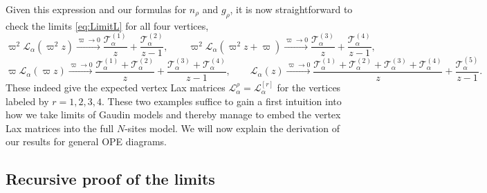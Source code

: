 \documentclass{article}
\def\Lc{\mathcal{L}}
\begin{document}
Given this expression and our formulas for $n_\rho$ and $g_\rho$, it is now straightforward to check
the limits \eqref{eq:LimitL} for all four vertices, 
\begin{equation}
\varpi^2 \Lc_\alpha(\varpi^2 z) \xrightarrow{\varpi\to 0} \frac{\mathcal{T}_\alpha^{(1)}}{z} +
\frac{\mathcal{T}_\alpha^{(2)}}{z-1}, \qquad \varpi^2 \Lc_\alpha(\varpi^2 z+\varpi) 
\xrightarrow{\varpi\to 0} \frac{\mathcal{T}_\alpha^{(3)}}{z} + \frac{\mathcal{T}_\alpha^{(4)}}{z-1},
\end{equation}
\begin{equation*}
\varpi \Lc_\alpha(\varpi z) \xrightarrow{\varpi\to 0} 
\frac{\mathcal{T}_\alpha^{(1)}+\mathcal{T}_\alpha^{(2)}}{z} + 
\frac{\mathcal{T}_\alpha^{(3)}+\mathcal{T}_\alpha^{(4)}}{z-1}, \qquad \Lc_\alpha(z) 
\xrightarrow{\varpi\to 0} \frac{\mathcal{T}_\alpha^{(1)}+\mathcal{T}_\alpha^{(2)}+
\mathcal{T}_\alpha^{(3)}+\mathcal{T}_\alpha^{(4)}}{z} + \frac{\mathcal{T}_\alpha^{(5)}}{z-1}.
\end{equation*}
These indeed give the expected vertex Lax matrices $\Lc_\alpha^\rho = \Lc_\alpha^{[r]}$ 
for the vertices labeled by $r=1,2,3,4$. These two examples suffice to gain 
a first intuition into how we take limits of Gaudin models and thereby manage to 
embed the vertex Lax matrices into the full $N$-sites model. We will now explain the derivation of our results for general OPE diagrams. 


\subsection{Recursive proof of the limits}
\label{sec:recursion}
\end{document}
